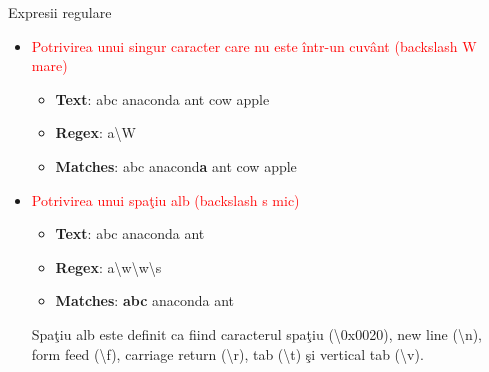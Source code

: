 \documentclass[pdf]{beamer}
\begin{document}
\begin{frame}{Expresii regulare}
\begin{itemize} 
\item\textcolor{red}{Potrivirea unui singur caracter care nu este într-un cuvânt (backslash W mare)}
	\begin{itemize}
	\item
		\textbf{Text}:       abc anaconda ant cow apple
	\item
		\textbf{Regex}:      a\textbackslash W
	\item
		\textbf{Matches}:    abc anacond\textbf{a} ant cow apple
	\end{itemize}

\item\textcolor{red}{Potrivirea unui spaţiu alb (backslash s mic)}
	\begin{itemize}
	\item
		\textbf{Text}:	  abc anaconda ant
	\item
		\textbf{Regex}:    a\textbackslash w\textbackslash w\textbackslash s 
	\item
		\textbf{Matches}:  \textbf{abc} anaconda ant
	\end{itemize}
	
	Spaţiu alb este definit ca fiind caracterul spaţiu (\textbackslash 0x0020), new line (\textbackslash n), form feed (\textbackslash f), carriage return (\textbackslash r), tab (\textbackslash t) şi vertical tab (\textbackslash v).
\end{itemize}
\end{frame}
\end{document}
